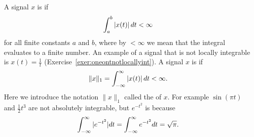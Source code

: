 A signal $x$ is  if
\[
\int_{a}^{b} \left\vert x(t) \right\vert dt < \infty
\]
for all finite constants $a$ and $b$, where by $< \infty$ we mean that the integral evaluates to a finite number.  
An example of a signal that is not locally integrable is $x(t) = \frac{1}{t}$ (Exercise~\ref{exer:oneontnotlocallyint}).  %
A signal $x$ is  if
\begin{equation}\label{eq:l1normdefncontinuous}
\|x\|_1 = \int_{-\infty}^{\infty} \left\vert x(t) \right\vert dt < \infty.
\end{equation}
Here we introduce the notation $\|x\|_1$ called the  of $x$.  For example $\sin( \pi t)$ and $\tfrac{1}{2}t^3$ are not absolutely integrable, but $e^{-t^2}$ is because~\citep{nicholas_1950_erf}
\begin{equation}\label{eq:expabssum}
\int_{-\infty}^{\infty} \vert e^{-t^2} \vert dt = \int_{-\infty}^{\infty} e^{-t^2} dt  = \sqrt{\pi}.
\end{equation}

